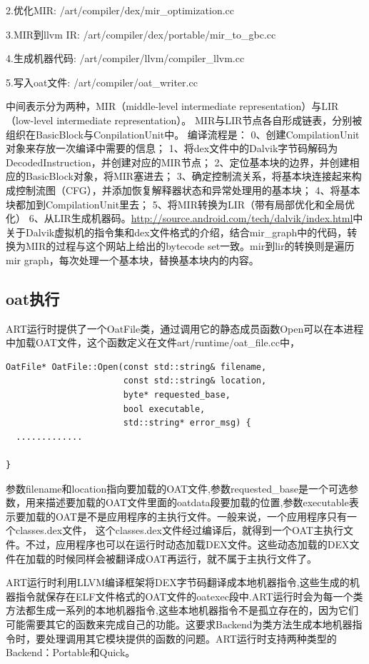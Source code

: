 2.优化MIR: /art/compiler/dex/mir\_optimization.cc

3.MIR到llvm IR: /art/compiler/dex/portable/mir\_to\_gbc.cc

4.生成机器代码: /art/compiler/llvm/compiler\_llvm.cc

5.写入oat文件: /art/compiler/oat\_writer.cc

中间表示分为两种，MIR（middle-level intermediate representation）与LIR（low-level intermediate representation）。 MIR与LIR节点各自形成链表，分别被组织在BasicBlock与ConpilationUnit中。 编译流程是： 0、创建CompilationUnit对象来存放一次编译中需要的信息； 1、将dex文件中的Dalvik字节码解码为DecodedInstruction，并创建对应的MIR节点； 2、定位基本块的边界，并创建相应的BasicBlock对象，将MIR塞进去； 3、确定控制流关系，将基本块连接起来构成控制流图（CFG），并添加恢复解释器状态和异常处理用的基本块； 4、将基本块都加到CompilationUnit里去； 5、将MIR转换为LIR（带有局部优化和全局优化） 6、从LIR生成机器码。\url{http://source.android.com/tech/dalvik/index.html}中关于Dalvik虚拟机的指令集和dex文件格式的介绍，结合mir\_graph中的代码，转换为MIR的过程与这个网站上给出的bytecode set一致。mir到lir的转换则是遍历mir graph，每次处理一个基本块，替换基本块内的内容。

\subsection{oat执行}
ART运行时提供了一个OatFile类，通过调用它的静态成员函数Open可以在本进程中加载OAT文件，这个函数定义在文件art/runtime/oat\_file.cc中，
\begin{lstlisting}
OatFile* OatFile::Open(const std::string& filename,
                       const std::string& location,
                       byte* requested_base,
                       bool executable,
                       std::string* error_msg) {
  .............

}
\end{lstlisting}
参数filename和location指向要加载的OAT文件,参数requested\_base是一个可选参数，用来描述要加载的OAT文件里面的oatdata段要加载的位置,参数executable表示要加载的OAT是不是应用程序的主执行文件。一般来说，一个应用程序只有一个classes.dex文件， 这个classes.dex文件经过编译后，就得到一个OAT主执行文件。不过，应用程序也可以在运行时动态加载DEX文件。这些动态加载的DEX文件在加载的时候同样会被翻译成OAT再运行，就不属于主执行文件了。

ART运行时利用LLVM编译框架将DEX字节码翻译成本地机器指令,这些生成的机器指令就保存在ELF文件格式的OAT文件的oatexec段中.ART运行时会为每一个类方法都生成一系列的本地机器指令,这些本地机器指令不是孤立存在的，因为它们可能需要其它的函数来完成自己的功能。这要求Backend为类方法生成本地机器指令时，要处理调用其它模块提供的函数的问题。ART运行时支持两种类型的Backend：Portable和Quick。

